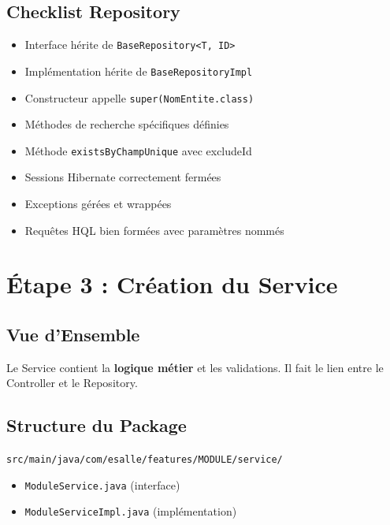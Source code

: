 \documentclass[12pt,a4paper]{article}
\begin{document}
\subsection{Checklist Repository}

\begin{itemize}
    \item[$\square$] Interface hérite de \texttt{BaseRepository<T, ID>}
    \item[$\square$] Implémentation hérite de \texttt{BaseRepositoryImpl}
    \item[$\square$] Constructeur appelle \texttt{super(NomEntite.class)}
    \item[$\square$] Méthodes de recherche spécifiques définies
    \item[$\square$] Méthode \texttt{existsByChampUnique} avec excludeId
    \item[$\square$] Sessions Hibernate correctement fermées
    \item[$\square$] Exceptions gérées et wrappées
    \item[$\square$] Requêtes HQL bien formées avec paramètres nommés
\end{itemize}

\newpage

\section{Étape 3 : Création du Service}

\subsection{Vue d'Ensemble}

Le Service contient la \textbf{logique métier} et les validations. Il fait le lien entre le Controller et le Repository.

\subsection{Structure du Package}

\begin{tcolorbox}[colback=gray!10]
\texttt{src/main/java/com/esalle/features/MODULE/service/}
\begin{itemize}
    \item \texttt{ModuleService.java} (interface)
    \item \texttt{ModuleServiceImpl.java} (implémentation)
\end{itemize}
\end{tcolorbox}
\end{document}
